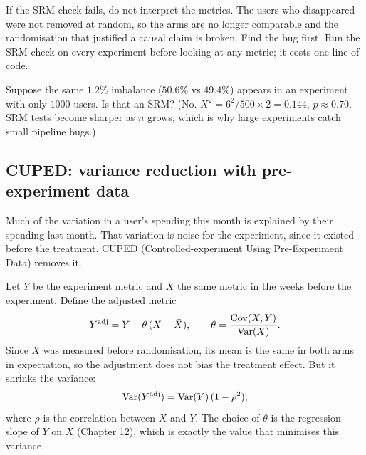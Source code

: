 \begin{trapbox}
If the SRM check fails, do not interpret the metrics. The users who
disappeared were not removed at random, so the arms are no longer comparable
and the randomisation that justified a causal claim is broken. Find the bug
first. Run the SRM check on every experiment before looking at any metric; it
costs one line of code.
\end{trapbox}

\begin{recoverybox}
Suppose the same $1.2\%$ imbalance ($50.6\%$ vs $49.4\%$) appears in an
experiment with only $1000$ users. Is that an SRM? (No. $X^2 = 6^2/500 \times 2 =
0.144$, $p \approx 0.70$. SRM tests become sharper as $n$ grows, which is why
large experiments catch small pipeline bugs.)
\end{recoverybox}

\subsection{CUPED: variance reduction with pre-experiment data}

Much of the variation in a user's spending this month is explained by their
spending last month. That variation is noise for the experiment, since it
existed before the treatment. CUPED (Controlled-experiment Using Pre-Experiment
Data) removes it.

Let $Y$ be the experiment metric and $X$ the same metric in the weeks before the
experiment. Define the adjusted metric
\[
  Y^{\text{adj}} = Y - \theta\,(X - \bar X), \qquad \theta = \frac{\operatorname{Cov}(X,Y)}{\operatorname{Var}(X)}.
\]
Since $X$ was measured before randomisation, its mean is the same in both arms
in expectation, so the adjustment does not bias the treatment effect. But it
shrinks the variance:
\[
  \operatorname{Var}(Y^{\text{adj}}) = \operatorname{Var}(Y)\,(1 - \rho^2),
\]
where $\rho$ is the correlation between $X$ and $Y$. The choice of $\theta$ is
the regression slope of $Y$ on $X$ (Chapter 12), which is exactly the value that
minimises this variance.

